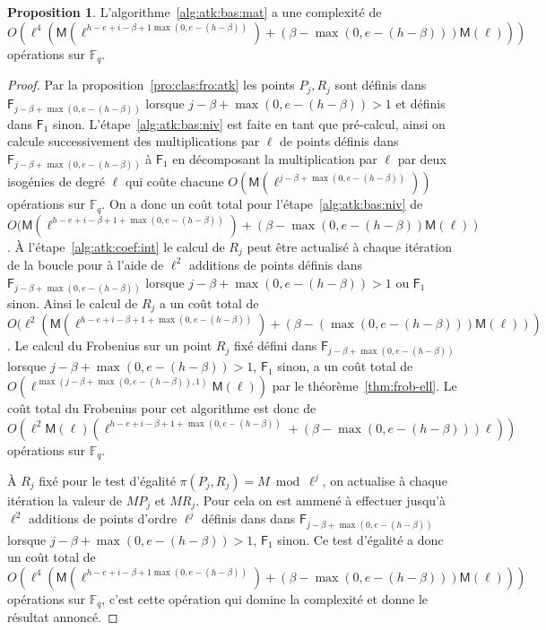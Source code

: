 \documentclass[10pt,a4paper]{book}
\theoremstyle{plain}
\theoremstyle{definition}
\theoremstyle{definition}
\theoremstyle{definition}
\newtheorem{prop}[thm]{Proposition}
\theoremstyle{definition}
\theoremstyle{remark}
\theoremstyle{remark}
\theoremstyle{definition}
\begin{document}
\begin{prop}
\label{pro:atk:comp:alg}
L'algorithme~\ref{alg:atk:bas:mat} a une complexité de 
\[
O(\ell^4(\mathsf{M}(\ell^{h-e+i-\beta+1\max(0,e-(h-\beta))})+(\beta-\max(0,e-(h-\beta)))\mathsf{M}(\ell)))
\]
opérations sur $\mathbb{F}_q$.
\end{prop}

\begin{proof}
Par la proposition~\ref{pro:clas:fro:atk} les points $P_j,R_j$ sont définis
dans $\mathsf{F}_{j-\beta+\max(0,e-(h-\beta))}$ lorsque $j-\beta+\max(0,e-(h-\beta))>1$ et 
définis dans $\mathsf{F}_1$ sinon. L'étape~\ref{alg:atk:bas:niv} est faite en 
tant que pré-calcul, ainsi on calcule successivement des multiplications par 
$\ell$ de points définis dans $\mathsf{F}_{j-\beta+\max(0,e-(h-\beta))}$ à 
$\mathsf{F}_{1}$ en décomposant la multiplication par $\ell$ par deux isogénies
de degré $\ell$ qui coûte chacune $O(\mathsf{M}(\ell^{j-\beta+\max(0,e-
(h-\beta))}))$ opérations sur $\mathbb{F}_q$. On a donc un coût total pour 
l'étape~\ref{alg:atk:bas:niv} de $O(\mathsf{M}(\ell^{h-e+i-\beta+1+\max(0,e-
(h-\beta))})+(\beta-\max(0,e-(h-\beta))\mathsf{M}(\ell))$.
\`A l'étape~\ref{alg:atk:coef:int} le calcul de $R_j$ peut être actualisé à 
chaque itération de la boucle pour à l'aide 
de $\ell^2$ additions de points définis dans $\mathsf{F}_{j-\beta+\max(0,e-(h-\beta))}$ 
lorsque $j-\beta+\max(0,e-(h-\beta))>1$ ou $\mathsf{F}_1$ sinon. Ainsi le calcul de $R_j$ a 
un coût total de 
$O(\ell^{2}(\mathsf{M}(\ell^{h-e+i-\beta+1+\max(0,e-(h-\beta))})+(\beta-(\max(0,e-(h-\beta)))\mathsf{M}(\ell)))$. 
Le calcul du Frobenius sur un point $R_j$ fixé défini dans 
$\mathsf{F}_{j-\beta+\max(0,e-(h-\beta))}$ lorsque $j-\beta+\max(0,e-(h-\beta))>1$, 
$\mathsf{F}_1$ sinon, a un coût total de $O(\ell^{\max(j-\beta+\max(0,e-(h-\beta)),1)}
\mathsf{M}(\ell))$ par le théorème~\ref{thm:frob-ell}. Le coût total du 
Frobenius pour cet algorithme est donc de 
$O(\ell^2\mathsf{M}(\ell)(\ell^{h-e+i-\beta+1+\max(0,e-(h-\beta))}+(\beta-\max(0,e-(h-\beta)))\ell))$ 
opérations sur $\mathbb{F}_q$.

\`A $R_j$ fixé pour le test d'égalité $\pi(P_j,R_j)= M \bmod \ell^j$, on 
actualise à chaque itération la valeur de $MP_j$ et $MR_j$. Pour cela on est 
ammené à effectuer jusqu'à $\ell^2$ additions de points d'ordre 
$\ell^{j}$ définis dans dans $\mathsf{F}_{j-\beta+\max(0,e-(h-\beta))}$ lorsque $j-\beta+\max(0,e-(h-\beta))>1$, 
$\mathsf{F}_1$ sinon. Ce test d'égalité a donc un coût total de 
$O(\ell^4(\mathsf{M}(\ell^{h-e+i-\beta+1\max(0,e-(h-\beta))})+(\beta-\max(0,e-(h-\beta)))\mathsf{M}(\ell)))$ 
opérations sur $\mathbb{F}_q$, c'est cette opération qui domine la complexité
et donne le résultat annoncé.
\end{proof}
\end{document}
